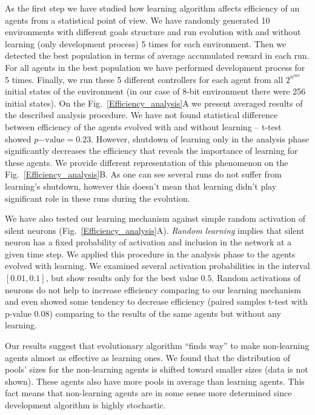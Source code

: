 \documentclass[letterpaper]{article}
\begin{document}
As the first step we have studied how learning algorithm affects efficiency of an agents from a statistical point of view. We have randomly generated 10 environments with different goals structure and run evolution with and without learning (only development process) 5 times for each environment. Then we detected the best population in terms of average accumulated reward in each run. For all agents in the best population we have performed development process for 5 times. Finally, we run these 5 different controllers for each agent from all $2^{n^{\mathrm{env}}}$ initial states of the environment (in our case of 8-bit environment there were 256 initial states). On the Fig.~\ref{Efficiency_analysis}A we present averaged results of the described analysis procedure. We have not found statistical difference between efficiency of the agents evolved with and without learning -- t-test showed $p\mathrm{-value}=0.23$. However, shutdown of learning only in the analysis phase significantly decreases the efficiency that reveals the importance of learning for these agents. We provide different representation of this phenomenon on the Fig.~\ref{Efficiency_analysis}B. As one can see several runs do not suffer from learning's shutdown, however this doesn't mean that learning didn't play significant role in these runs during the evolution. 

We have also tested our learning mechanism against simple random activation of silent neurons (Fig.~\ref{Efficiency_analysis}A). {\em Random learning} implies that silent neuron has a fixed probability of activation and inclusion in the network at a given time step. We applied this procedure in the analysis phase to the agents evolved with learning. We examined several activation probabilities in the interval $\left[0.01,0.1\right]$, but show results only for the best value $0.5$. Random activations of neurons do not help to increase efficiency comparing to our learning mechanism and even showed some tendency to decrease efficiency (paired samples t-test with p-value $0.08$) comparing to the results of the same agents but without any learning.

Our results suggest that evolutionary algorithm ``finds way'' to make non-learning agents almost as effective as learning ones. We found that the distribution of pools' sizes for the non-learning agents is shifted toward smaller sizes (data is not shown). These agents also have more pools in average than learning agents. This fact means that non-learning agents are in some sense more determined since development algorithm is highly stochastic. 
\end{document}
